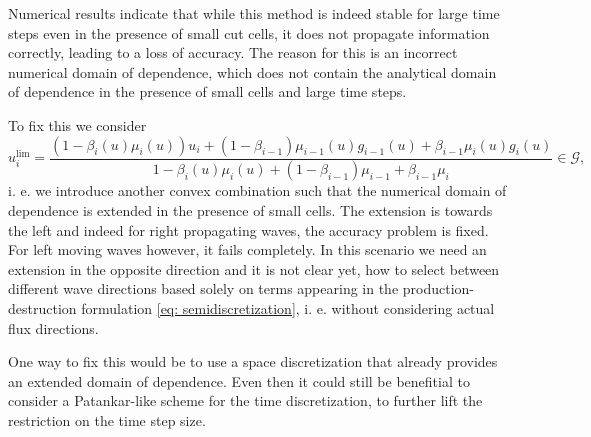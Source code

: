 \documentclass[]{article}
\begin{document}
Numerical results indicate that while this method is indeed stable for large time steps even in the presence of small cut cells, it does not propagate information correctly, leading to a loss of accuracy. The reason for this is an incorrect numerical domain of dependence, which does not contain the analytical domain of dependence in the presence of small cells and large time steps.

To fix this we consider
$$u_i^{\text{lim}} = \frac{(1-\beta_i(u)\mu_i(u))u_i+ (1 - \beta_{i-1})\mu_{i-1}(u)g_{i-1}(u) +  \beta_{i-1}\mu_i(u)g_i(u)}{1-\beta_i(u)\mu_i(u) + (1 - \beta_{i-1}) \mu_{i-1} + \beta_{i-1} \mu_i} \in \mathcal{G},$$
i. e. we introduce another convex combination such that the numerical domain of dependence is extended in the presence of small cells. The extension is towards the left and indeed for right propagating waves, the accuracy problem is fixed. For left moving waves however, it fails completely. In this scenario we need an extension in the opposite direction and it is not clear yet, how to select between different wave directions based solely on terms appearing in the production-destruction formulation \eqref{eq: semidiscretization}, i. e. without considering actual flux directions.

One way to fix this would be to use a space discretization that already provides an extended domain of dependence. Even then it could still be benefitial to consider a Patankar-like scheme for the time discretization, to further lift the restriction on the time step size.
\end{document}
